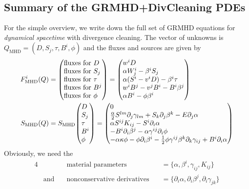 \documentclass[a4paper]{article}
\newcommand{\desc}[1]{\text{#1}\quad}
\newcommand{\mhd}{\text{MHD}}
\newenvironment{pvector}{\begin{pmatrix*}[l]}{\end{pmatrix*}}
\begin{document}
\subsection{Summary of the GRMHD+DivCleaning PDEs}
For the simple overview, we write down the full set of GRMHD equations
for \emph{dynamical spacetime} with divergence cleaning. The vector of
unknowns is $Q_\mhd=(D,S_j,\tau,B^i,\phi)$ and the fluxes and sources are
given by
\begin{align}
F^i_\mhd(Q) &=
\begin{pvector}
\text{fluxes for } D \\
\text{fluxes for } S_j \\
\text{fluxes for } \tau \\
\text{fluxes for }  B^j \\
\text{fluxes for } \phi
\end{pvector}
=
\begin{pvector}
w^i D \\
\alpha W^i_j - \beta^i S_j \\
\alpha (S^i - v^i D) - \beta^i \tau \\
w^i B^j - v^j B^i - B^i \beta^j \\
\alpha B^i - \phi \beta^i
\end{pvector}
\\
S_\mhd(Q) &=
S_\mhd
\begin{pvector}
D \\
S_j \\
\tau \\
 B^i \\
\phi
\end{pvector}
=
\begin{pvector}
0
\\
\frac \alpha2 S^{lm} \partial_j \gamma_{lm} + S_k \partial_j \beta^k - E \partial_j \alpha
\\
\alpha S^{ij} K_{ij} - S^i \partial_i \alpha
\\
-B^i \partial_i \beta^j - \alpha \gamma^{ij} \partial_i \phi \\
- \alpha \kappa \phi - \phi \partial_i \beta^i
- \frac 12 \phi \gamma^{ij}
\beta^k \partial_k \gamma_{ij}
+ B^i \partial_i \alpha
\end{pvector}
\end{align}
Obviously, we need the
\begin{alignat}{4}
&&
\desc{material parameters}  &= \{ \alpha, \beta^i, \gamma_{ij}, K_{ij} \}
\\
&\desc{and}
&
\desc{nonconservative derivatives} &= \{ \partial_i \alpha,
\partial_i \beta^j, \partial_i \gamma_{jk} \}
\end{alignat}
\end{document}
